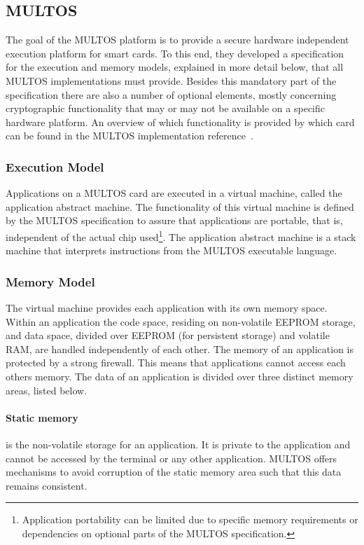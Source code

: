 \subsection{MULTOS}\label{sec:multos}

The goal of the MULTOS platform is to provide a secure hardware independent
execution platform for smart cards. To this end, they developed a specification
for the execution and memory models, explained in more detail below, that all
MULTOS implementations must provide. Besides this mandatory part of the
specification there are also a number of optional elements, mostly concerning
cryptographic functionality that may or may not be available on a specific
hardware platform. An overview of which functionality is provided by which card
can be found in the MULTOS implementation reference~\cite{MIR2012}.

\subsubsection{Execution Model}

Applications on a MULTOS card are executed in a virtual machine, called the
application abstract machine. The functionality of this virtual machine is
defined by the MULTOS specification to assure that applications are portable,
that is, independent of the actual chip used\footnote{Application portability
can be limited due to specific memory requirements or dependencies on optional
parts of the MULTOS specification.}. The application abstract machine is a stack
machine that interprets instructions from the MULTOS executable language.

\subsubsection{Memory Model}

The virtual machine provides each application with its own memory space. Within
an application the code space, residing on non-volatile EEPROM storage, and data
space, divided over EEPROM (for persistent storage) and volatile RAM, are
handled independently of each other. The memory of an application is protected
by a strong firewall. This means that applications cannot access each others
memory. The data of an application is divided over three distinct memory areas,
listed below.

\paragraph{Static memory} is the non-volatile storage for an application. It is
private to the application and cannot be accessed by the terminal or any other
application. MULTOS offers mechanisms to avoid corruption of the static memory
area such that this data remains consistent.

